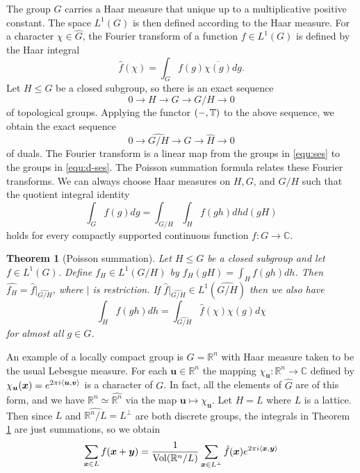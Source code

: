 \documentclass[11pt]{article}
\theoremstyle{plain}
\newtheorem{theorem}{Theorem}
\theoremstyle{definition}
\let\hom\relax
\DeclareMathOperator{\hom}{Hom}
\DeclarePairedDelimiter{\lrang}{\langle}{\rangle}
\def\C{\mathbb{C}}
\def\R{\mathbb{R}}
\begin{document}
The group $G$ carries a Haar measure that unique up to a multiplicative positive constant. The space $L^1(G)$ is then defined according to the Haar measure. For a character $\chi \in \widehat{G}$, the Fourier transform of a function $f \in L^1(G)$ is defined by the Haar integral
\[ \hat{f}(\chi) = \int_{G} f(g)\overline{\chi(g)} dg. \]
Let $H \le G$ be a closed subgroup, so there is an exact sequence
\begin{equation}
    \label{equ:ses}
    0 \rightarrow H \rightarrow G \rightarrow G / H \rightarrow 0
\end{equation}
of topological groups. Applying the functor $\hom(-, \mathbb{T})$ to the above sequence, we obtain the exact sequence
\begin{equation}
    \label{equ:d-ses}
    0 \rightarrow \widehat{G / H} \rightarrow \widehat{G} \rightarrow \widehat{H} \rightarrow 0
\end{equation}
of duals. The Fourier transform is a linear map from the groups in \eqref{equ:ses} to the groups in \eqref{equ:d-ses}. The Poisson summation formula relates these Fourier transforms. We can always choose Haar measures on $H, G$, and $G / H$ such that the quotient integral identity
\[ \int_G f(g) dg = \int_{G / H} \int_H f(gh) dh d(gH) \]
holds for every compactly supported continuous function $f: G \rightarrow \C$.
\begin{theorem}[Poisson summation]
    \label{thm:poisson-sum}
    Let $H \le G$ be a closed subgroup and let $f \in L^1(G)$. Define $f_H \in L^1(G / H)$ by $f_H(gH) = \int_H f(gh) dh$. Then $\widehat{f_H} = \hat{f} \vert_{\widehat{G / H}}$, where $\vert$ is restriction. If $\hat{f} \vert_{\widehat{G / H}} \in L^1(\widehat{G / H})$ then we also have
    \[ \int_{H} f(gh) dh = \int_{\widehat{G / H}} \hat{f}(\chi) \chi(g) d\chi \]
    for almost all $g \in G$.
\end{theorem}
An example of a locally compact group is $G = \R^n$ with Haar measure taken to be the usual Lebesgue measure. For each $\bm{u} \in \R^n$ the mapping $\chi_{\bm{u}}: \R^n \rightarrow \C$ defined by $\chi_{\bm{u}}(\bm{x}) = e^{2\pi i \lrang{\bm{u}, \bm{v}}}$ is a character of $G$. In fact, all the elements of $\widehat{G}$ are of this form, and we have $\R^n \simeq \widehat{\R^n}$ via the map $\bm{u} \mapsto \chi_{\bm{u}}$. Let $H = L$ where $L$ is a lattice. Then since $L$ and $\widehat{\R^n / L} = L^\perp$ are both discrete groups, the integrals in Theorem \ref{thm:poisson-sum} are just summations, so we obtain
\[ \sum_{\bm{x} \in L} f(\bm{x} + \bm{y}) = \frac{1}{\mathrm{Vol}(\R^n / L)}\sum_{\bm{x} \in L^\perp} \hat{f}(\bm{x})e^{2\pi i \lrang{\bm{x}, \bm{y}}}  \]
\end{document}
